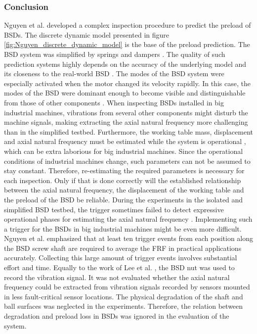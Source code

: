 \subsubsection{Conclusion}
Nguyen et al. \cite{NGUYEN2019} developed a complex inspection procedure to predict the preload of BSDs. The discrete dynamic model presented in figure \ref{fig:Nguyen_discrete_dynamic_model} is the base of the preload prediction. The BSD system was simplified by springs and dampers \cite{NGUYEN2019}. The quality of such prediction systems highly depends on the accuracy of the underlying model and its closeness to the real-world BSD \cite{ZHAO2019213}. The modes of the BSD system were especially activated when the motor changed its velocity rapidly. In this case, the modes of the BSD were dominant enough to become visible and distinguishable from those of other components \cite{NGUYEN2019}. When inspecting BSDs installed in big industrial machines, vibrations from several other components might disturb the machine signals, making extracting the axial natural frequency more challenging than in the simplified testbed. Furthermore, the working table mass, displacement and axial natural frequency must be estimated while the system is operational \cite{NGUYEN2019}, which can be extra laborious for big industrial machines. Since the operational conditions of industrial machines change, such parameters can not be assumed to stay constant. Therefore, re-estimating the required parameters is necessary for each inspection. Only if that is done correctly will the established relationship between the axial natural frequency, the displacement of the working table and the preload of the BSD be reliable. During the experiments in the isolated and simplified BSD testbed, the trigger sometimes failed to detect expressive operational phases for estimating the axial natural frequency \cite{NGUYEN2019}. Implementing such a trigger for the BSDs in big industrial machines might be even more difficult. Nguyen et al. \cite{NGUYEN2019} emphasized that at least ten trigger events from each position along the BSD screw shaft are required to average the FRF in practical applications accurately. Collecting this large amount of trigger events involves substantial effort and time. Equally to the work of Lee et al. \cite{Lee2015}, the BSD nut was used to record the vibration signal. It was not evaluated whether the axial natural frequency could be extracted from vibration signals recorded by sensors mounted in less fault-critical sensor locations. The physical degradation of the shaft and ball surfaces was neglected in the experiments. Therefore, the relation between degradation and preload loss in BSDs was ignored in the evaluation of the system. 

